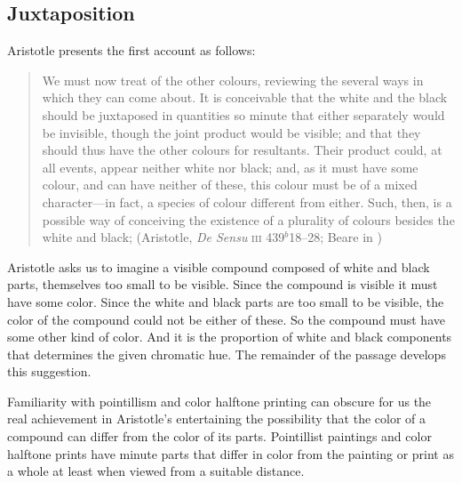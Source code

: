 \subsection{Juxtaposition} %
\label{sub:juxtaposition}

Aristotle presents the first account as follows:
\begin{quote}
	We must now treat of the other colours, reviewing the several ways in which they can come about. It is conceivable that the white and the black should be juxtaposed in quantities so minute that either separately would be invisible, though the joint product would be visible; and that they should thus have the other colours for resultants. Their product could, at all events, appear neither white nor black; and, as it must have some colour, and can have neither of these, this colour must be of a mixed character---in fact, a species of colour different from either. Such, then, is a possible way of conceiving the existence of a plurality of colours besides the white and black; (Aristotle, \emph{De Sensu} \textsc{iii} 439\( ^{b} \)18--28; Beare in \citealt[8]{Barnes:1984uq})
\end{quote}
Aristotle asks us to imagine a visible compound composed of white and black parts, themselves too small to be visible. Since the compound is visible it must have some color. Since the white and black parts are too small to be visible, the color of the compound could not be either of these. So the compound must have some other kind of color. And it is the proportion of white and black components that determines the given chromatic hue. The remainder of the passage develops this suggestion. 

Familiarity with pointillism and color halftone printing can obscure for us the real achievement in Aristotle's entertaining the possibility that the color of a compound can differ from the color of its parts. Pointillist paintings and color halftone prints have minute parts that differ in color from the painting or print as a whole at least when viewed from a suitable distance. 


